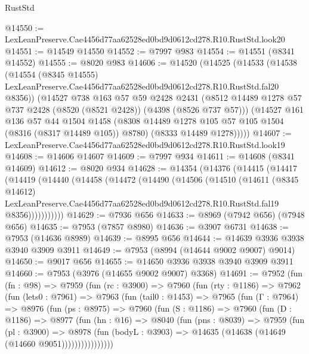 \begin{lexlean}{RustStd}
\begin{coremodule}
@14550 := LexLeanPreserve.Cae4456d77aa62528ed0bd9d0612cd278.R10.RustStd.look20
@14551 := @14549 @14550
@14552 := @7997 @983
@14554 := @14551 (@8341 @14552)
@14555 := @8020 @983
@14606 := @14520
    (@14525
      (@14533
        (@14538
          (@14554
            (@8345 @14555)
            LexLeanPreserve.Cae4456d77aa62528ed0bd9d0612cd278.R10.RustStd.fal20
            @8356))
        (@14527
          @738
          @163
          @57
          @59
          @2428
          @2431
          (@8512 @14489 @1278 @57 @737 @2428 (@8520 (@8521 @2428)) (@4398 (@8526 @737 @57)))
          (@14527
            @161
            @136
            @57
            @44
            @1504
            @1458
            (@8308 @14489 @1278 @105 @57 @105 @1504 (@8316 (@8317 @14489 @105)) @8780)
            (@8333 @14489 @1278)))))
@14607 := LexLeanPreserve.Cae4456d77aa62528ed0bd9d0612cd278.R10.RustStd.look19
@14608 := @14606 @14607
@14609 := @7997 @934
@14611 := @14608 (@8341 @14609)
@14612 := @8020 @934
@14628 := @14354
    (@14376
      (@14415
        (@14417
          (@14419
            (@14440
              (@14458
                (@14472
                  (@14490
                    (@14506
                      (@14510
                        (@14611
                          (@8345 @14612)
                          LexLeanPreserve.Cae4456d77aa62528ed0bd9d0612cd278.R10.RustStd.fal19
                          @8356)))))))))))
@14629 := @7936 @656
@14633 := @8969 (@7942 @656) (@7948 @656)
@14635 := @7953 (@7857 @8980)
@14636 := @3907 @6731
@14638 := @7953 (@14636 @8989)
@14639 := @8995 @656
@14644 := @14639 @3936 @3938 @3940 @3909 @3911
@14649 := @7953 (@8994 (@14644 @9002 @9007) @9014)
@14650 := @9017 @656
@14655 := @14650 @3936 @3938 @3940 @3909 @3911
@14660 := @7953 (@3976 (@14655 @9002 @9007) @3368)
@14691 := @7952
    (fun (fn : @98) =>
    @7959
      (fun (rc : @3900) =>
      @7960
        (fun (rty : @1186) =>
        @7962
          (fun (lets0 : @7961) =>
          @7963
            (fun (tail0 : @1453) =>
            @7965
              (fun (Γ : @7964) =>
              @8976
                (fun (ps : @8975) =>
                @7960
                  (fun (S : @1186) =>
                  @7960
                    (fun (D : @1186) =>
                    @8977
                      (fun (hn : @16) =>
                      @8040
                        (fun (pns : @8039) =>
                        @7959
                          (fun (pl : @3900) =>
                          @8978
                            (fun (bodyL : @3903) =>
                            @14635 (@14638 (@14649 (@14660 @9051))))))))))))))))

\end{coremodule}
\end{lexlean}
